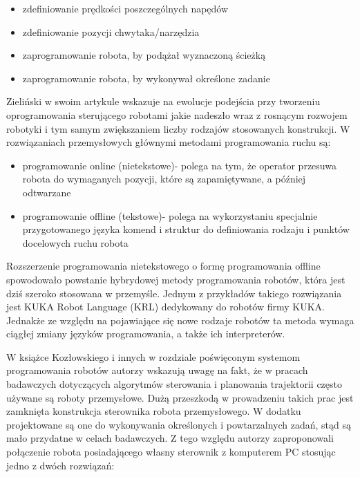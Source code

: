 \documentclass[a4paper, 12pt, twoside]{article}
\begin{document}
\begin{itemize}
\item zdefiniowanie prędkości poszczególnych napędów
\item zdefiniowanie pozycji chwytaka/narzędzia
\item zaprogramowanie robota, by podążał wyznaczoną ścieżką
\item zaprogramowanie robota, by wykonywał określone zadanie
\end{itemize}

Zieliński w swoim artykule \cite{ramowezielinski} wskazuje na ewolucje podejścia przy tworzeniu oprogramowania sterującego robotami jakie nadeszło wraz z rosnącym rozwojem robotyki i tym samym zwiększaniem liczby rodzajów stosowanych konstrukcji. W rozwiązaniach przemysłowych głównymi metodami programowania ruchu są:

\begin{itemize}
\item programowanie online (nietekstowe)- polega na tym, że operator przesuwa robota do wymaganych pozycji, które są zapamiętywane, a później odtwarzane
\item programowanie offline (tekstowe)- polega na wykorzystaniu specjalnie przygotowanego języka komend i struktur do definiowania rodzaju i punktów docelowych ruchu robota
\end{itemize}

Rozszerzenie programowania nietekstowego o formę programowania offline spowodowało powstanie hybrydowej metody programowania robotów, która jest dziś szeroko stosowana w przemyśle. Jednym z przykładów takiego rozwiązania jest KUKA Robot Language (KRL) \cite{kukawebsite} dedykowany do robotów firmy KUKA. Jednakże ze względu na pojawiające się nowe rodzaje robotów ta metoda wymaga ciągłej zmiany języków programowania, a także ich interpreterów.

W książce Kozłowskiego i innych \cite{systemkozlowski} w rozdziale poświęconym systemom programowania robotów autorzy wskazują uwagę na fakt, że w pracach badawczych dotyczących algorytmów sterowania i planowania trajektorii często używane są roboty przemysłowe. Dużą przeszkodą w prowadzeniu takich prac jest zamknięta konstrukcja sterownika robota przemysłowego. W dodatku projektowane są one do wykonywania określonych i powtarzalnych zadań, stąd są mało przydatne w celach badawczych. Z tego względu autorzy zaproponowali połączenie robota posiadającego własny sterownik z komputerem PC stosując jedno z dwóch rozwiązań:
\end{document}
